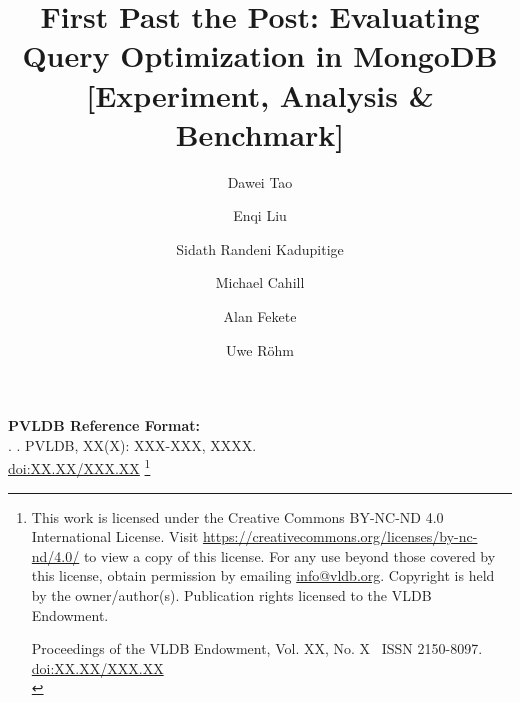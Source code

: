 \documentclass[sigconf, nonacm]{acmart}
\newcommand\vldbdoi{XX.XX/XXX.XX}
\newcommand\vldbpages{XXX-XXX}
\newcommand\vldbvolume{XX}
\newcommand\vldbissue{X}
\newcommand\vldbyear{XXXX}
\newcommand\vldbauthors{\authors}
\newcommand\vldbtitle{\shorttitle}
\newcommand\vldbpagestyle{plain}
\begin{document}
\title{First Past the Post: Evaluating Query Optimization in MongoDB [Experiment, Analysis \& Benchmark]}


\author{Dawei Tao}

\author{Enqi Liu}

\author{Sidath Randeni Kadupitige}

\author{Michael Cahill} 

\author{Alan Fekete}

\author{Uwe R{\"o}hm}




\maketitle

\pagestyle{\vldbpagestyle}
\begingroup\small\noindent\raggedright\textbf{PVLDB Reference Format:}\\
\vldbauthors. \vldbtitle. PVLDB, \vldbvolume(\vldbissue): \vldbpages, \vldbyear.\\
\href{https://doi.org/\vldbdoi}{doi:\vldbdoi}
\endgroup
\begingroup
\renewcommand\thefootnote{}\footnote{\noindent
This work is licensed under the Creative Commons BY-NC-ND 4.0 International License. Visit \url{https://creativecommons.org/licenses/by-nc-nd/4.0/} to view a copy of this license. For any use beyond those covered by this license, obtain permission by emailing \href{mailto:info@vldb.org}{info@vldb.org}. Copyright is held by the owner/author(s). Publication rights licensed to the VLDB Endowment. \\
\raggedright Proceedings of the VLDB Endowment, Vol. \vldbvolume, No. \vldbissue\ %
ISSN 2150-8097. \\
\href{https://doi.org/\vldbdoi}{doi:\vldbdoi} \\
}\addtocounter{footnote}{-1}\endgroup
\end{document}

